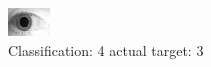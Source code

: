 \begin{figure}[h!]
\begin{center}
\includegraphics[width=0.60\columnwidth]{figures/ID1966_class_4_target_3.png}
\end{center}
\caption{ Classification: 4 actual target: 3}
\label{fig:ID1966_class_4_target_3}
\end{figure}

